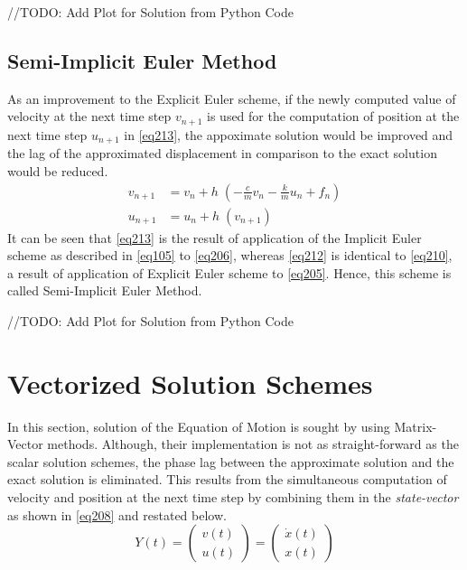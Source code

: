//TODO: Add Plot for Solution from Python Code
\subsection{Semi-Implicit Euler Method}
As an improvement to the Explicit Euler scheme, if the newly computed value of velocity at the next time step $v_{n+1}$ is used for the computation of position at the next time step $u_{n+1}$ in \cref{eq213}, the appoximate solution would be improved and the lag of the approximated displacement in comparison to the exact solution would be reduced. 
\begin{align}
v_{n+1} &= v_{n} + h \; (-\frac{c}{m} v_{n} - \frac{k}{m} u_{n} + f_{n})\label{eq212}\\
u_{n+1} &= u_{n} + h \; (v_{n+1})\label{eq213}
\end{align}
It can be seen that \cref{eq213} is the result of application of the Implicit Euler scheme as described in \cref{eq105} to \cref{eq206}, whereas \cref{eq212} is identical to \cref{eq210}, a result of application of Explicit Euler scheme to \cref{eq205}. Hence, this scheme is called Semi-Implicit Euler  Method.

//TODO: Add Plot for Solution from Python Code

\section{Vectorized Solution Schemes}
In this section, solution of the Equation of Motion is sought by using Matrix-Vector methods. Although, their implementation is not as straight-forward as the scalar solution schemes, the phase lag between the approximate solution and the exact solution is eliminated. This results from the simultaneous computation of velocity and position at the next time step by combining them in the \emph{state-vector} as shown in \cref{eq208} and restated below.
\begin{equation}\label{eq214}
 Y(t) =
\begin{pmatrix}
	v(t) \\[3pt]
	u(t)
\end{pmatrix}
 = 
 \begin{pmatrix}
	\dot{x}(t) \\[3pt]
	x(t)
\end{pmatrix}
\end{equation}
